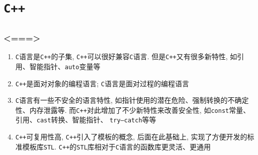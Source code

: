 \newpage
\thispagestyle{fancy}
\setcounter{page}{1}
\chapter{\tt C++}
\thispagestyle{fancy}
\section{\color{blue}{基础}}

\subsection{<===>}

\begin{enumerate}
	\item {\tt C}语言是{\tt C++}的子集, {\tt C++}可以很好兼容{\tt C}语言. 但是{\tt C++}又有很多新特性, 
			如引用、智能指针、{\tt auto}变量等
	\item {\tt C++}是面对对象的编程语言; {\tt C}语言是面对过程的编程语言
	\item {\tt C}语言有一些不安全的语言特性, 如指针使用的潜在危险、强制转换的不确定性、内存泄露等. 
			而{\tt C++}对此增加了不少新特性来改善安全性, 如{\tt const}常量、引用、{\tt cast}转换、智能指针、
			{\tt try—catch}等等
	\item {\tt C++}可复用性高, {\tt C++}引入了模板的概念, 后面在此基础上, 实现了方便开发的标准模板库{\tt STL}. 
			{\tt C++}的{\tt STL}库相对于{\tt C}语言的函数库更灵活、更通用
\end{enumerate}

